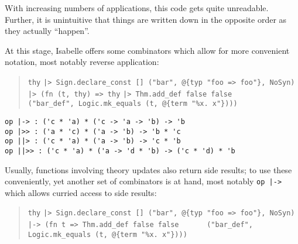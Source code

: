 \begin{isabellebody}
\begin{isamarkuptext}
  With increasing numbers of applications, this code gets quite
  unreadable.  Further, it is unintuitive that things are
  written down in the opposite order as they actually ``happen''.%
\end{isamarkuptext}%
\isamarkuptrue%
%
\begin{isamarkuptext}%
\noindent At this stage, Isabelle offers some combinators which allow
  for more convenient notation, most notably reverse application:
  \begin{quotation}
\verb|thy|\isasep\isanewline%
\verb||\verb,|,\verb|> Sign.declare_const [] ("bar", @{typ "foo => foo"}, NoSyn)|\isasep\isanewline%
\verb||\verb,|,\verb|> (fn (t, thy) => thy|\isasep\isanewline%
\verb||\verb,|,\verb|> Thm.add_def false false|\isasep\isanewline%
\verb|     ("bar_def", Logic.mk_equals (t, @{term "%x. x"})))|
  \end{quotation}%
\end{isamarkuptext}%
\isamarkuptrue%
%
\isadelimmlref
%
\endisadelimmlref
%
\isatagmlref
%
\begin{isamarkuptext}%
\begin{mldecls}
  \verb|op |\verb,|,\verb|-> : ('c * 'a) * ('c -> 'a -> 'b) -> 'b| \\
  \verb|op |\verb,|,\verb|>> : ('a * 'c) * ('a -> 'b) -> 'b * 'c| \\
  \verb|op |\verb,|,\verb||\verb,|,\verb|> : ('c * 'a) * ('a -> 'b) -> 'c * 'b| \\
  \verb|op |\verb,|,\verb||\verb,|,\verb|>> : ('c * 'a) * ('a -> 'd * 'b) -> ('c * 'd) * 'b| \\
  \end{mldecls}%
\end{isamarkuptext}%
\isamarkuptrue%
%
\endisatagmlref
{\isafoldmlref}%
%
\isadelimmlref
%
\endisadelimmlref
%
\begin{isamarkuptext}%
\noindent Usually, functions involving theory updates also return
  side results; to use these conveniently, yet another
  set of combinators is at hand, most notably \verb|op |\verb,|,\verb|->|
  which allows curried access to side results:
  \begin{quotation}
\verb|thy|\isasep\isanewline%
\verb||\verb,|,\verb|> Sign.declare_const [] ("bar", @{typ "foo => foo"}, NoSyn)|\isasep\isanewline%
\verb||\verb,|,\verb|-> (fn t => Thm.add_def false false|\isasep\isanewline%
\verb|      ("bar_def", Logic.mk_equals (t, @{term "%x. x"})))|\isasep\isanewline%


\end{quotation}
\end{isamarkuptext}
\end{isabellebody}
